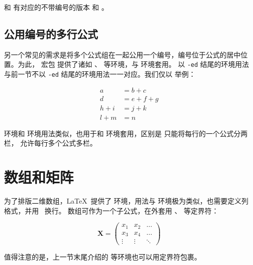  和  有对应的不带编号的版本  和 。

\subsection{公用编号的多行公式}\label{subsec:aligned}

另一个常见的需求是将多个公式组在一起公用一个编号，编号位于公式的居中位置。为此， 宏包
提供了诸如 、 等环境，与  环境套用。
以 \texttt{-ed} 结尾的环境用法与前一节不以 \texttt{-ed} 结尾的环境用法一一对应。我们仅以  举例：
\begin{example}
\begin{equation}
\begin{aligned}
a &= b + c \\
d &= e + f + g \\
h + i &= j + k \\
l + m &= n
\end{aligned}
\end{equation}
\end{example}

 环境和  环境用法类似，也用于和  环境套用，区别是  只能将每行的一个公式分两栏，
 允许每行多个公式多栏。


\section{数组和矩阵}\label{sec:arrays}

为了排版二维数组，\LaTeX\ 提供了  环境，用法与  环境极为类似，也需要定义列格式，并用 \crcmd\ 换行。
数组可作为一个子公式，在外套用 、 等定界符：
\begin{example}
\[
\mathbf{X} = \left(
\begin{array}{ccc}
x_1 & x_2 & \ldots \\
x_3 & x_4 & \ldots \\
\vdots & \vdots & \ddots
\end{array} \right)
\]
\end{example}

值得注意的是，上一节末尾介绍的  等环境也可以用定界符包裹。

